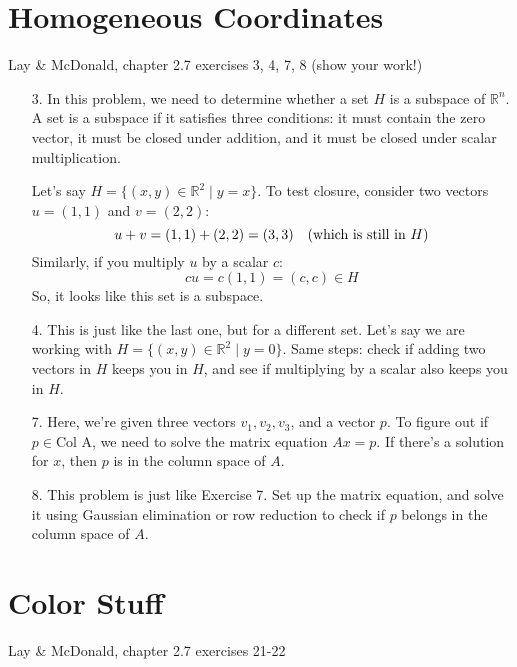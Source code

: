 \documentclass[12pt]{article}
\theoremstyle{definition}
\begin{document}
\newpage
\section{Homogeneous Coordinates}

Lay \& McDonald, chapter 2.7 exercises 3, 4, 7, 8 (show your work!)

{\color{red}
\begin{enumerate}
    \item[3.] In this problem, we need to determine whether a set \( H \) is a subspace of \( \mathbb{R}^n \). A set is a subspace if it satisfies three conditions: it must contain the zero vector, it must be closed under addition, and it must be closed under scalar multiplication.

    Let’s say \( H = \{(x, y) \in \mathbb{R}^2 \mid y = x\} \). To test closure, consider two vectors \( u = (1, 1) \) and \( v = (2, 2) \):
    \[
    u + v = (1, 1) + (2, 2) = (3, 3) \quad \text{(which is still in \( H \))}
    \]
    Similarly, if you multiply \( u \) by a scalar \( c \):
    \[
    c u = c(1, 1) = (c, c) \in H
    \]
    So, it looks like this set is a subspace.

    \item[4.] This is just like the last one, but for a different set. Let’s say we are working with \( H = \{(x, y) \in \mathbb{R}^2 \mid y = 0\} \). Same steps: check if adding two vectors in \( H \) keeps you in \( H \), and see if multiplying by a scalar also keeps you in \( H \).

    \item[7.] Here, we’re given three vectors \( v_1, v_2, v_3 \), and a vector \( p \). To figure out if \( p \in \text{Col A} \), we need to solve the matrix equation \( A x = p \). If there's a solution for \( x \), then \( p \) is in the column space of \( A \).

    \item[8.] This problem is just like Exercise 7. Set up the matrix equation, and solve it using Gaussian elimination or row reduction to check if \( p \) belongs in the column space of \( A \).
\end{enumerate}
}


\newpage
\section{Color Stuff}

Lay \& McDonald, chapter 2.7 exercises 21-22 \\
\end{document}
